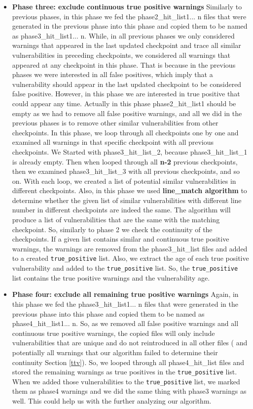 \begin{itemize}
\item{\textbf{Phase three: exclude continuous true positive warnings}}
Similarly to previous phases, in this phase we fed the phase2\_hit\_list1... n files that were generated in the previous phase into this phase and copied them to be named as phase3\_hit\_list1... n. While, in all previous phases we only considered warnings that appeared in the last updated checkpoint and trace all similar vulnerabilities in preceding checkpoints, we considered all warnings that appeared at any checkpoint in this phase. That is because in the previous phases we were interested in all false positives, which imply that a vulnerability should appear in the last updated checkpoint to be considered false positive. However, in this phase we are interested in true positive that could appear any time. Actually in this phase phase2\_hit\_list1 should be empty as we had to remove all false positive warnings, and all we did in the previous phases is to remove other similar vulnerabilities from other checkpoints. In this phase, we loop through all checkpoints one by one and examined all warnings in that specific checkpoint with all previous checkpoints. We Started with phase3\_hit\_list\_2, because phase3\_hit\_list\_1 is already empty. Then when looped through all \textbf{n-2} previous checkpoints, then we examined phase3\_hit\_list\_3 with all previous checkpoints, and so on. With each loop, we created a list of potential  similar vulnerabilities in different checkpoints. Also, in this phase we used \textbf{line\_match algorithm}  to determine whether the given list of similar vulnerabilities with different line number in different checkpoints are indeed the same. The algorithm will produce a list of vulnerabilities that are the same with the matching checkpoint. So, similarly to phase 2 we check the continuity of the checkpoints. If a given list contains similar and continuous true positive warnings, the warnings are removed from the phase3\_hit\_list files and added to a created \texttt{true\_positive} list. Also, we extract the age of each true positive vulnerability and added to the \texttt{true\_positive} list. So, the \texttt{true\_positive} list contains the true positive warnings and the vulnerability age.


\item{\textbf{Phase four: exclude all remaining true positive warnings}}
Again, in this phase we fed the phase3\_hit\_list1... n files that were generated in the previous phase into this phase and copied them to be named as phase4\_hit\_list1... n. So, as we removed all false positive warnings and all continuous true positive warnings, the copied files will only include vulnerabilities that are unique and do not reintroduced in all other files ( and potentially all warnings that our algorithm failed to determine their continuity Section \ref{ttv}).  So, we looped through all phase4\_hit\_list files and stored the remaining warnings as true positives in the \texttt{true\_positive} list. When we added those vulnerabilities to the \texttt{true\_positive} list, we marked them as phase4 warnings and we did the same thing with phase3 warnings as well. This could help us with the further analyzing our algorithm.
\end{itemize}

